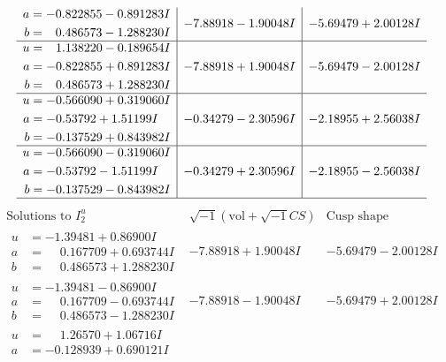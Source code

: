 \documentclass[1p]{elsarticle_modified}
\theoremstyle{definition}
\newcommand{\I}{\sqrt{-1}}
\begin{document}
$$\begin{array}{c|c|c}
\begin{aligned}
a &= -0.822855 - 0.891283 I \\
b &= \phantom{-}0.486573 - 1.288230 I\end{aligned}
 & -7.88918 - 1.90048 I & -5.69479 + 2.00128 I \\ \hline\begin{aligned}
u &= \phantom{-}1.138220 - 0.189654 I \\
a &= -0.822855 + 0.891283 I \\
b &= \phantom{-}0.486573 + 1.288230 I\end{aligned}
 & -7.88918 + 1.90048 I & -5.69479 - 2.00128 I \\ \hline\begin{aligned}
u &= -0.566090 + 0.319060 I \\
a &= -0.53792 + 1.51199 I \\
b &= -0.137529 + 0.843982 I\end{aligned}
 & -0.34279 - 2.30596 I & -2.18955 + 2.56038 I \\ \hline\begin{aligned}
u &= -0.566090 - 0.319060 I \\
a &= -0.53792 - 1.51199 I \\
b &= -0.137529 - 0.843982 I\end{aligned}
 & -0.34279 + 2.30596 I & -2.18955 - 2.56038 I\\
 \hline 
 \end{array}$$\newpage$$\begin{array}{c|c|c}  
\text{Solutions to }I^u_{2}& \I (\text{vol} + \sqrt{-1}CS) & \text{Cusp shape}\\
 \hline 
\begin{aligned}
u &= -1.39481 + 0.86900 I \\
a &= \phantom{-}0.167709 + 0.693744 I \\
b &= \phantom{-}0.486573 + 1.288230 I\end{aligned}
 & -7.88918 + 1.90048 I & -5.69479 - 2.00128 I \\ \hline\begin{aligned}
u &= -1.39481 - 0.86900 I \\
a &= \phantom{-}0.167709 - 0.693744 I \\
b &= \phantom{-}0.486573 - 1.288230 I\end{aligned}
 & -7.88918 - 1.90048 I & -5.69479 + 2.00128 I \\ \hline\begin{aligned}
u &= \phantom{-}1.26570 + 1.06716 I \\
a &= -0.128939 + 0.690121 I \\

\end{aligned}
\end{array}$$
\end{document}
